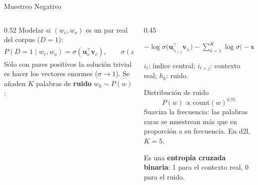 \documentclass[aspectratio=169, 10pt]{beamer}
\newcommand{\formula}[1]{%
	\begin{tcolorbox}[colback=UCMBlue!8, colframe=UCMBlue, arc=4pt,
		boxsep=2pt, left=6pt, right=6pt, top=3pt, bottom=3pt]
		#1
	\end{tcolorbox}
}
\begin{document}
\begin{frame}{Muestreo Negativo}

	\begin{columns}[T]
		\begin{column}{0.52\textwidth}
			\small
			Modelar si $(w_c, w_o)$ es un par real del corpus ($D=1$):
			\[
				P(D=1 \mid w_c, w_o) = \sigma(\mathbf{u}_o^\top \mathbf{v}_c), \qquad \sigma(x) = \frac{1}{1+e^{-x}}
			\]
			S\'olo con pares positivos la soluci\'on trivial es hacer los vectores enormes ($\sigma \to 1$). Se a\~naden $K$ palabras de \textbf{ruido} $w_k \sim P(w)$:
			\begin{center}
			\end{center}
		\end{column}

		\begin{column}{0.45\textwidth}
			\formula{\small $-\log \sigma\big(\mathbf{u}_{i_{t+j}}^\top \mathbf{v}_{i_t}\big) - \displaystyle\sum_{k=1}^{K} \log \sigma\big(-\mathbf{u}_{h_k}^\top \mathbf{v}_{i_t}\big)$}
			\scriptsize
			$i_t$: \'indice central; $i_{t+j}$: contexto real; $h_k$: ruido.

			\vspace{0.2cm}

			\begin{block}{Distribuci\'on de ruido}
				\small
				\[
					P(w) \propto \mathrm{count}(w)^{0.75}
				\]
				Suaviza la frecuencia: las palabras raras se muestrean m\'as que en proporci\'on a su frecuencia. En d2l, $K=5$.
			\end{block}

			\small
			Es una \textbf{entrop\'ia cruzada binaria}: 1 para el contexto real, 0 para el ruido.
		\end{column}
	\end{columns}

\end{frame}
\end{document}
